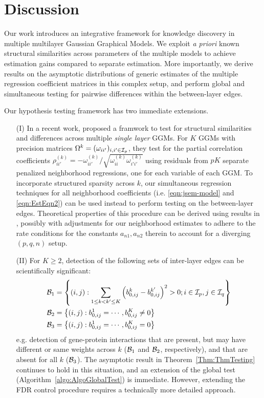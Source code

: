 \section{Discussion}
Our work introduces an integrative framework for knowledge discovery in multiple multilayer Gaussian Graphical Models. We exploit {\it a priori} known structural similarities across parameters of the multiple models to achieve estimation gains compared to separate estimation. More importantly, we derive results on the asymptotic distributions of generic estimates of the multiple regression coefficient matrices in this complex setup, and perform global and simultaneous testing for pairwise differences within the between-layer edges.

Our hypothesis testing framework has two immediate extensions.

\begin{itemize}
\item[(I)] In a recent work, \cite{Liu17} proposed a framwork to test for structural similarities and differences across multiple {\it single layer} GGMs. For $K$ GGMs with precision matrices $\Omega^k = (\omega_{ii'})_{i,i' \in {\cal{I}}_p}$, they test for the partial correlation coefficients $\rho_{ii'}^{(k)} = - \omega_{ii'}^{(k)} / \sqrt{\omega_{ii}^{(k)} \omega_{i'i'}^{(k)}}$ using residuals from $pK$ separate penalized neighborhood regressions, one for each variable of each GGM. To incorporate structured sparsity across $k$, our simultaneous regression techniques for all neighborhood coefficients (i.e. \eqref{eqn:jsem-model} and \eqref{eqn:EstEqn2}) can be used instead to perform testing on the between-layer edges. Theoretical properties of this procedure can be derived using results in \cite{Liu17}, possibly with adjustments for our neighborhood estimates to adhere to the rate conditions for the constants $a_{n1}, a_{n2}$ therein to account for a diverging $(p,q,n)$ setup.

\item[(II)] For $K \geq 2$, detection of the following sets of inter-layer edges can be scientifically significant:
%
\begin{align*}
{\cal{B}}_1 &= \left\{ (i,j): \sum_{1 \leq k < k' \leq K} \left(b_{0,ij}^k - b_{0,ij}^{k'} \right)^2 > 0; i \in {\cal{I}}_p, j \in {\cal{I}}_q \right\}\\
{\cal{B}}_2 &= \left\{ (i,j): b_{0,ij}^1 = \cdots, b_{0,ij}^K \neq 0 \right\}\\
{\cal{B}}_3 &= \left\{ (i,j): b_{0,ij}^1 = \cdots, b_{0,ij}^K = 0 \right\}
\end{align*}
%
e.g. detection of gene-protein interactions that are present, but may have different or same weights across $k$ (${\cal{B}}_1$ and ${\cal{B}}_2$, respectively), and that are absent for all $k$ (${\cal{B}}_3$). The asymptotic result in Theorem~\ref{Thm:ThmTesting} continues to hold in this situation, and an extension of the global test (Algorithm~\ref{algo:AlgoGlobalTest}) is immediate. However, extending the FDR control procedure requires a technically more detailed approach.
\end{itemize}

